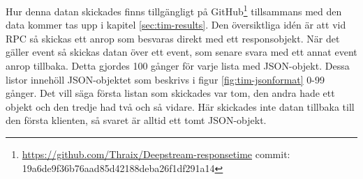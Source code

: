 Hur denna datan skickades finns tillgängligt på GitHub\footnote{\url{https://github.com/Thraix/Deepstream-responsetime} \newline commit: 19a6de9f36b76aad85d42188deba26f1df291a14 } tillsammans med den data kommer tas upp i kapitel \ref{sec:tim-results}. Den översiktliga idén är att vid RPC så skickas ett anrop som besvaras direkt med ett responsobjekt. När det gäller event så skickas datan över ett event, som senare svara med ett annat event anrop tillbaka. Detta gjordes 100 gånger för varje lista med JSON-objekt. Dessa listor innehöll JSON-objektet som beskrivs i figur \ref{fig:tim-jsonformat} 0-99 gånger. Det vill säga första listan som skickades var tom, den andra hade ett objekt och den tredje had två och så vidare. Här skickades inte datan tillbaka till den första klienten, så svaret är alltid ett tomt JSON-objekt. 
